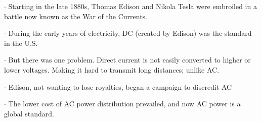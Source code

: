 \documentclass[preview]{standalone}
\begin{document}
\centering \begin{flushleft} $\cdot$ Starting in the late 1880s, Thomas Edison and Nikola Tesla were embroiled in a battle now known as the War of the Currents.\end{flushleft} \begin{flushleft} $\cdot$ During the early years of electricity, DC (created by Edison) was the standard in the U.S.\end{flushleft} \begin{flushleft} $\cdot$ But there was one problem. Direct current is not easily converted to higher or lower voltages. Making it hard to transmit long distances; unlike AC.\end{flushleft} \begin{flushleft} $\cdot$ Edison, not wanting to lose royalties, began a campaign to discredit AC\end{flushleft} \begin{flushleft} $\cdot$ The lower cost of AC power distribution prevailed, and now AC power is a global standard.\end{flushleft}
\end{document}
